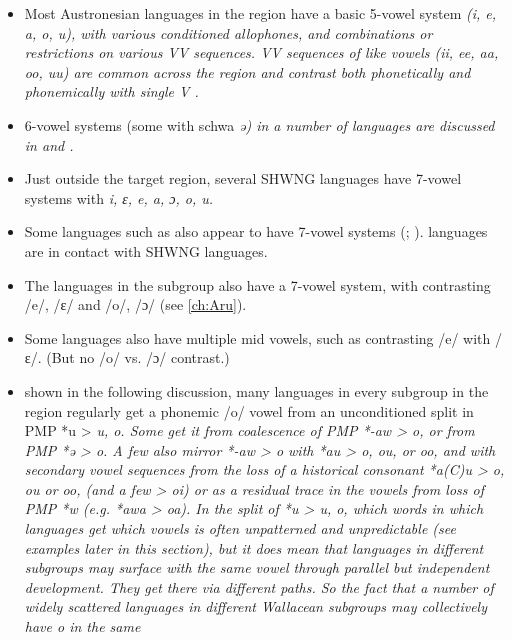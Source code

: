 \begin{itemize}
	\item	Most Austronesian languages in the region have a basic
				5-vowel system \it{(i, e, a, o, u}),
				with various conditioned allophones,
				and combinations or restrictions on various VV sequences.
				VV sequences of like vowels (\it{ii,
				ee, aa, oo, uu}) are common across the region
				and contrast both phonetically
				and phonemically with single V \citep{Grimes1991c,CulhaneEdwards2021,Tamelan2021}.
	\item	6-vowel systems (some with schwa \it{ə}) in a number of
				 languages are discussed in  and .
	\item	Just outside the target region,
				several SHWNG languages have 7-vowel systems with \it{i,
				ɛ, e, a, ɔ, o, u}.
	\item	Some  languages such as  also
				appear to have 7-vowel systems (\citealp[651]{Voorhoeve1995a}; \citealp[43]{Jackson2014}).
				 languages are in contact with SHWNG languages.
	\item	The  languages in the  subgroup also have
				a 7-vowel system, with contrasting /e/,
				/ɛ/ and /o/, /ɔ/ (see \ref{ch:Aru}).
	\item Some languages  also have multiple
				mid vowels, such as  contrasting /e/ with /ɛ/.
				(But no /o/ vs. /ɔ/ contrast.)
	\item	{} shown in the following discussion,
				many languages in every subgroup in the region regularly get
				a phonemic /o/ vowel from an unconditioned split in PMP *u > \it{u, o}.
				Some get it from coalescence of PMP *-aw > \it{o},
				or from PMP *ə > \it{o}.
				A few also mirror *-aw > \it{o} with *au > \it{o,
				ou,} or \it{oo}, and with secondary vowel sequences from the
				loss of a historical consonant *a(C)u > \it{o,
				ou} or \it{oo}, (and a few > \it{oi}) or as a residual trace
				in the vowels from loss of PMP *w (e.g. *awa > \it{oa}).
				In the split of *u > \it{u,
				o}, which words in which languages get which vowels is often
				unpatterned and unpredictable (see examples later in this section),
				but it does mean that languages in different subgroups may surface
				with the same vowel through parallel but independent development.
				They get there via different paths.
				So the fact that a number of widely scattered languages in different
				Wallacean subgroups may collectively have \it{o} in the same

\end{itemize}
